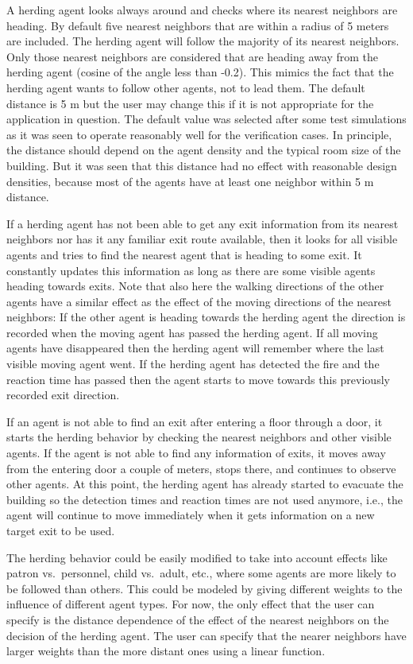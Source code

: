 \documentclass[12pt,a4paper,final,twoside]{stylevk}
\begin{document}
A herding agent looks always around and checks where its nearest
neighbors are heading.  By default five nearest neighbors that are
within a radius of 5 meters are included.  The herding agent will
follow the majority of its nearest neighbors.  Only those nearest
neighbors are considered that are heading away from the herding agent
(cosine of the angle less than -0.2).  This mimics the fact that the
herding agent wants to follow other agents, not to lead them.  The
default distance is 5 m but the user may change this if it is not
appropriate for the application in question.  The default value was
selected after some test simulations as it was seen to operate
reasonably well for the verification cases.  In principle, the
distance should depend on the agent density and the typical room size
of the building.  But it was seen that this distance had no effect
with reasonable design densities, because most of the agents have at
least one neighbor within 5 m distance.


If a herding agent has not been able to get any exit information from
its nearest neighbors nor has it any familiar exit route available,
then it looks for all visible agents and tries to find the nearest
agent that is heading to some exit.  It constantly updates this
information as long as there are some visible agents heading towards
exits.  Note that also here the walking directions of the other agents
have a similar effect as the effect of the moving directions of the
nearest neighbors: If the other agent is heading towards the herding
agent the direction is recorded when the moving agent has passed the
herding agent.  If all moving agents have disappeared then the herding
agent will remember where the last visible moving agent went.  If the
herding agent has detected the fire and the reaction time has passed
then the agent starts to move towards this previously recorded exit
direction.


If an agent is not able to find an exit after entering a floor through
a door, it starts the herding behavior by checking the nearest
neighbors and other visible agents.  If the agent is not able to find
any information of exits, it moves away from the entering door a
couple of meters, stops there, and continues to observe other agents.
At this point, the herding agent has already started to evacuate the
building so the detection times and reaction times are not used
anymore, i.e., the agent will continue to move immediately when it
gets information on a new target exit to be used.


The herding behavior could be easily modified to take into account
effects like patron vs.\ personnel, child vs.\ adult, etc., where some
agents are more likely to be followed than others.  This could be
modeled by giving different weights to the influence of different
agent types.  For now, the only effect that the user can specify is
the distance dependence of the effect of the nearest neighbors on the
decision of the herding agent.  The user can specify that the nearer
neighbors have larger weights than the more distant ones using a
linear function.
\end{document}
